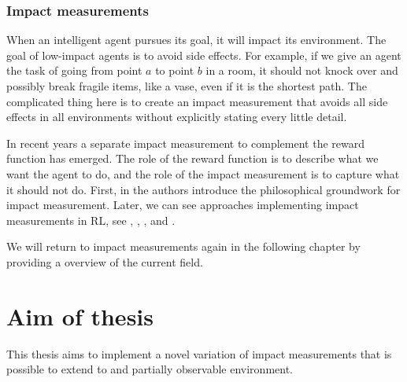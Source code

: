 \documentclass[12pt,A4]{report}
\newcommand{\autobaj}{}
\theoremstyle{definition}
\begin{document}

\subsubsection{Impact measurements}

When an intelligent agent pursues its goal, it will impact its environment. The goal of low-impact agents is to avoid side effects. For example, if we give an agent the task of going from point $a$ to point $b$ in a room, it should not knock over and possibly break fragile items, like a vase, even if it is the shortest path. The complicated thing here is to create an impact measurement that avoids all side effects in all environments without explicitly stating every little detail.

In recent years a separate impact measurement to complement the reward function has emerged. The role of the reward function is to describe what we want the agent to do, and the role of the impact measurement is to capture what it should not do. First, in \citet{ArmstrongLevinstein} the authors introduce the philosophical groundwork for impact measurement. Later, we can see approaches implementing impact measurements in RL, see \citet{Eysenbach}, \citet{Krakovna19}, \citet{Turner19}, and \citet{Krakovna20}.

We will return to impact measurements again in the following chapter by providing a overview of the current field. 

\section{Aim of thesis}
This thesis aims to implement a novel variation of impact measurements that is possible to extend to and partially observable environment.
\end{document}
